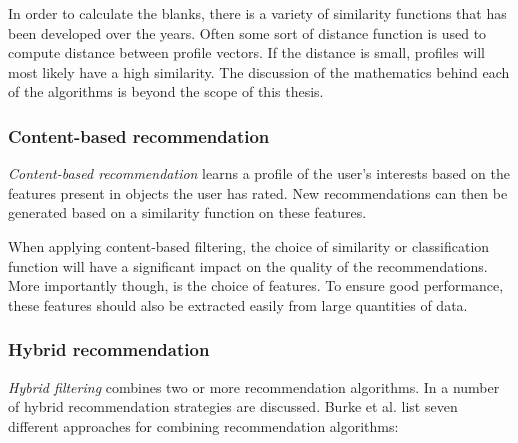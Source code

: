 In order to calculate the blanks, there is a variety of similarity functions that has been developed over the years. Often some sort of distance function is used to compute distance between profile vectors. If the distance is small, profiles will most likely have a high similarity\cite{rajaraman:2012}. The discussion of the mathematics behind each of the algorithms is beyond the scope of this thesis.



\subsubsection{Content-based recommendation}\label{chapter:literature_study:section:computer:subsection:algorithms:subsubsection:cbf}

\emph{Content-based recommendation} learns a profile of the user's interests based on the features present in objects the user has rated. New recommendations can then be generated based on a similarity function on these features\cite{burke:2002, pazzani:2007:CRS:1768197.1768209}.

When applying content-based filtering, the choice of similarity or classification function will have a significant impact on the quality of the recommendations. More importantly though, is the choice of features. To ensure good performance, these features should also be extracted easily from large quantities of data.


\subsubsection{Hybrid recommendation}\label{chapter:literature_study:section:computer:subsection:algorithms:subsubsection:hf}

\emph{Hybrid filtering} combines two or more recommendation algorithms\cite{burke:2002}. In \cite{burke:2002} a number of hybrid recommendation strategies are discussed. Burke et al. list seven different approaches for combining recommendation algorithms:

